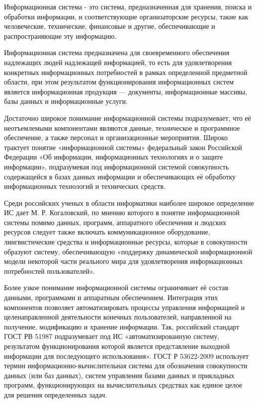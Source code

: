 Информационная система - это система, предназначенная для хранения, поиска и обработки информации, и соответствующие организаторские ресурсы, такие как человеческие, технические, финансовые и другие, обеспечивающие и распространяющие эту информацию.

Информационная система предназначена для своевременного обеспечения надлежащих людей надлежащей информацией, то есть для удовлетворения конкретных информационных потребностей в рамках определенной предметной области, при этом результатом функционирования информационных систем является информационная продукция — документы, информационные массивы, базы данных и информационные услуги.

Достаточно широкое понимание информационной системы подразумевает, что её неотъемлемыми компонентами являются данные, техническое и программное обеспечение, а также персонал и организационные мероприятия. Широко трактует понятие «информационной системы» федеральный закон Российской Федерации «Об информации, информационных технологиях и о защите информации», подразумевая под информационной системой совокупность содержащейся в базах данных информации и обеспечивающих её обработку информационных технологий и технических средств.

Среди российских ученых в области информатики наиболее широкое определение ИС дает М. Р. Когаловский, по мнению которого в понятие информационной системы помимо данных, программ, аппаратного обеспечения и людских ресурсов следует также включать коммуникационное оборудование, лингвистические средства и информационные ресурсы, которые в совокупности образуют систему, обеспечивающую «поддержку динамической информационной модели некоторой части реального мира для удовлетворения информационных потребностей пользователей».

Более узкое понимание информационной системы ограничивает её состав данными, программами и аппаратным обеспечением. Интеграция этих компонентов позволяет автоматизировать процессы управления информацией и целенаправленной деятельности конечных пользователей, направленной на получение, модификацию и хранение информации. Так, российский стандарт ГОСТ РВ 51987 подразумевает под ИС «автоматизированную систему, результатом функционирования которой является представление выходной информации для последующего использования». ГОСТ Р 53622-2009 использует термин информационно-вычислительная система для обозначения совокупности данных (или баз данных), систем управления базами данных и прикладных программ, функционирующих на вычислительных средствах как единое целое для решения определенных задач.

